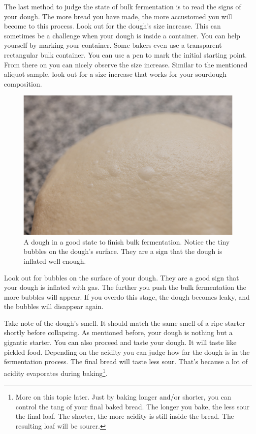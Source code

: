 The last method to judge the state of bulk fermentation
is to read the signs of your dough. The more bread you have
made, the more accustomed you will become to this process.
Look out for the dough's size increase. This can sometimes
be a challenge when your dough is inside a container.
You can help yourself by marking your container. Some bakers
even use a transparent rectangular bulk container. You
can use a pen to mark the initial starting point. From there
on you can nicely observe the size increase. Similar to the
mentioned aliquot sample, look out for a size increase that works
for your sourdough composition.

\begin{figure}[!htb]
  \includegraphics[width=\textwidth]{bulk-finished-dough}
  \caption[Dough at the end of bulk fermentation]{A dough in a good state to
      finish bulk fermentation. Notice the tiny bubbles on the dough's surface.
      They are a sign that the dough is inflated well enough.}
\end{figure}

Look out for bubbles on the surface of your dough. They
are a good sign that your dough is inflated with gas. The
further you push the bulk fermentation the more bubbles
will appear. If you overdo this stage, the dough becomes leaky, and
the bubbles will disappear again.

Take note of the dough's smell. It should match the same
smell of a ripe starter shortly before collapsing. As mentioned
before, your dough is nothing but a gigantic starter. You
can also proceed and taste your dough. It will taste like
pickled food. Depending on the acidity you can judge how
far the dough is in the fermentation process. The final bread
will taste less sour. That's because a lot of acidity evaporates
during baking\footnote{More on this topic later.
Just by baking longer and/or shorter, you can control
the tang of your final baked bread. The longer
you bake, the less sour the final loaf. The shorter,
the more acidity is still inside the bread. The resulting
loaf will be sourer.}.

